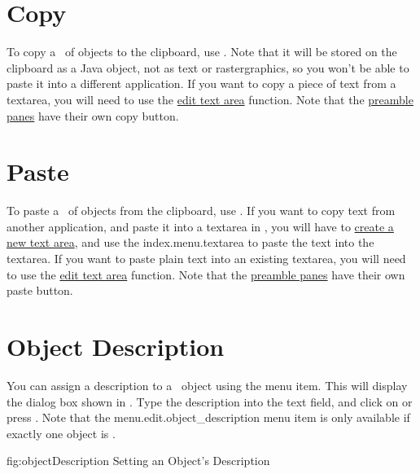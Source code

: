 \section{Copy}\label{sec:copyobjects}


To copy a \selection\ of \glspl{object} to the
clipboard, use . Note that it will be stored
on the clipboard as a  Java object, not as text or
\gls{rastergraphics}, so you won't be able to paste it into a different
application.  If you want to copy a piece of text from a
\gls{textarea}, you will need to use the
\hyperref[sec:edittext]{edit text area} function.
Note that the \hyperref[sec:preamble]{preamble panes} have
their own copy button.

\section{Paste}\label{sec:pasteobjects}


To paste a \selection\ of \glspl{object} from the clipboard, use
. If you want to copy text from another
application, and paste it into a \gls{textarea} in \FlowframTk, you
will have to \hyperref[sec:newtext]{create a new text area}, and
use the \gls{index.menu.textarea} to paste the text into the
\gls*{textarea}.  If you want to paste plain text into an existing
\gls*{textarea}, you will need to use the
\hyperref[sec:edittext]{edit text area} function.  Note that the
\hyperref[sec:preamble]{preamble panes} have their own paste button.

\section{Object Description}\label{sec:objectdescription}


You can assign a description to a \selected\ \gls*{object} using the
 menu item. This will display the
dialog box shown in . Type the
description into the text field, and click on  or press
.  Note that the \gls{menu.edit.object_description}
menu item is only available if exactly one object is \selected.

\FloatFig
  {fig:objectDescription}
  {}
  {Setting an Object's Description}

